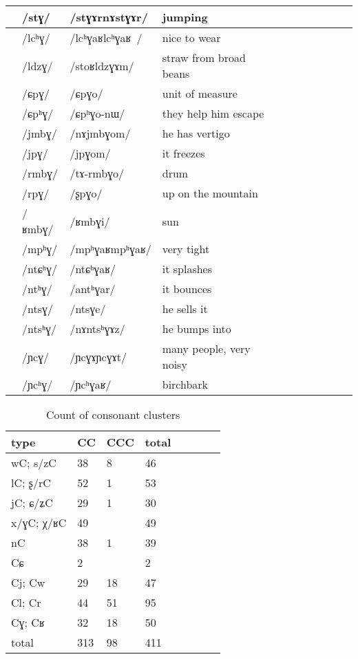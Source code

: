 \documentclass[oldfontcommands,oneside,a4paper,11pt]{article}
\newcommand{\ipa}[1]{\mbox{/#1/}} %
\newcommand{\deux}[1]{/#1/}
\newcommand{\trois}[1]{/#1/}
\newcommand{\idph}[1]{\cellcolor{gray}\textbf{#1}}
\begin{document}
\begin{landscape}
\begin{longtable}{l|lll|lll|lll|l}
		&\trois{stɣ}  	&\ipa{stɣɤrnɤstɣɤr}  	& jumping	&	&	&\\
\midrule						
	&\trois{lcʰɣ} \idph{} 	&\ipa{lcʰɣaʁlcʰɣaʁ }  	&nice to wear	&	&	&\\
	&\trois{ldzɣ}  	&\ipa{stoʁldzɣɤm}  	&straw from broad beans 	&	&	&\\
\midrule				
&\deux{ɕpɣ}		&\ipa{ɕpɣo}  	&unit of measure	&	&	&\\
	&\trois{ɕpʰɣ}  	&\ipa{ɕpʰɣo-nɯ}  	&they help him escape	&	&	&\\
\midrule						
	&\trois{jmbɣ}  	&\ipa{nɤjmbɣom}  	&he has vertigo	&	&	&\\
	&\trois{jpɣ}  	&\ipa{jpɣom}  	&it freezes	&	&	&\\
\midrule						
 	&\trois{rmbɣ}  	&\ipa{tɤ-rmbɣo}  	&drum	&	&	&\\
	&\trois{rpɣ}  	&\ipa{ʂpɣo}  	&up on the mountain	&	&	&\\
\midrule						
	&\trois{ʁmbɣ}  	&\ipa{ʁmbɣi}  	&sun	&	&	&\\
\midrule		
	&\trois{mpʰɣ}\idph{}   	&\ipa{mpʰɣaʁmpʰɣaʁ}  	&very tight	&	&	&\\				
	&\trois{ntɕʰɣ}  	&\ipa{ntɕʰɣaʁ}  	&it splashes	&	&	&\\
	&\trois{ntʰɣ}  	&\ipa{antʰɣar}  	&it bounces	&	&	&\\
	&\trois{ntsɣ}  	&\ipa{ntsɣe}  	&he sells it	&	&	&\\
	&\trois{ntsʰɣ}  	&\ipa{nɤntsʰɣɤz}  	&he bumps into	&	&	&\\
	&\trois{ɲcɣ}\idph{}  	&\ipa{ɲcɣɤɲcɣɤt}  	&many people, very noisy	&	&	&\\
	&\trois{ɲcʰɣ}  	&\ipa{ɲcʰɣaʁ}  	&birchbark	&	&	&\\
\end{longtable}	

	\end{landscape}
						
		   \begin{table}[H]
 \caption{Count of consonant clusters} \label{tab:clusters.tot}  \centering
\begin{tabular}{llllllll}
\toprule		
type &CC& CCC& total\\		
\midrule
wC; s/zC  & 	38  & 	8  & 	46  & 	\\	
lC; ʂ/rC  & 	52  & 	1  & 	53  & 	\\	
jC; ɕ/ʑC  & 	29  & 	1  & 	30  & 	\\	
x/ɣC; χ/ʁC  & 	49 & 	  & 	49  & 	\\	
nC  & 	38  & 	1  & 	39  & 	\\	
\midrule
Cɕ  & 	2  & 	  & 	  2& 	\\	
\midrule
Cj; Cw  & 	29  & 	18  & 	47  & 	\\	
Cl; Cr  & 	44  & 	51  & 	95  & 	\\	
Cɣ; Cʁ  & 	32  & 	18  & 	50  & 	\\	
\midrule
total  & 	313  & 	98  & 	411  & 	\\	
\bottomrule
\end{tabular}
\end{table}
 
\end{document}
